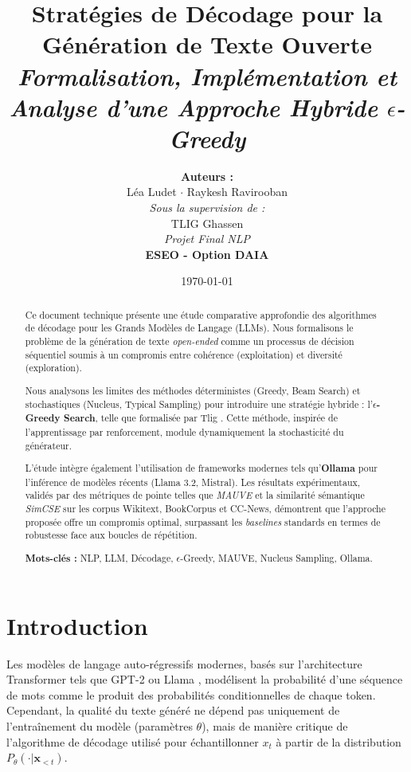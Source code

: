 \documentclass[12pt,a4paper]{article}
\title{
    \vspace{2cm}
    \textbf{\Huge Strat\'egies de D\'ecodage pour la G\'en\'eration de Texte Ouverte} \\ [1cm]
    \large \textit{Formalisation, Impl\'ementation et Analyse d'une Approche Hybride $\epsilon$-Greedy}
}
\author{
    \textbf{Auteurs :} \\[0.2cm]
    L\'ea Ludet $\cdot$ Raykesh Ravirooban \\[0.5cm]
    \small \textit{Sous la supervision de :} \\
    TLIG Ghassen \\[0.5cm]
    \small \textit{Projet Final NLP} \\
    \textbf{ESEO - Option DAIA}
}
\date{\today}
\newcommand{\context}{\mathbf{x}_{<t}}
\newcommand{\token}{x_t}
\newcommand{\prob}{P_\theta}
\begin{document}
\maketitle
\thispagestyle{empty}

\begin{abstract}
    \noindent Ce document technique pr\'esente une \'etude comparative approfondie des algorithmes de d\'ecodage pour les Grands Mod\`eles de Langage (LLMs). Nous formalisons le probl\`eme de la g\'en\'eration de texte \textit{open-ended} comme un processus de d\'ecision s\'equentiel soumis \`a un compromis entre coh\'erence (exploitation) et diversit\'e (exploration).
    
    Nous analysons les limites des m\'ethodes d\'eterministes (Greedy, Beam Search) et stochastiques (Nucleus, Typical Sampling) pour introduire une strat\'egie hybride : l'\textbf{$\epsilon$-Greedy Search}, telle que formalis\'ee par Tlig \cite{tlig2025epsilon}. Cette m\'ethode, inspir\'ee de l'apprentissage par renforcement, module dynamiquement la stochasticit\'e du g\'en\'erateur.
    
    L'\'etude int\`egre \'egalement l'utilisation de frameworks modernes tels qu'\textbf{Ollama} pour l'inf\'erence de mod\`eles r\'ecents (Llama 3.2, Mistral). Les r\'esultats exp\'erimentaux, valid\'es par des m\'etriques de pointe telles que \textit{MAUVE} et la similarit\'e s\'emantique \textit{SimCSE} sur les corpus Wikitext, BookCorpus et CC-News, d\'emontrent que l'approche propos\'ee offre un compromis optimal, surpassant les \textit{baselines} standards en termes de robustesse face aux boucles de r\'ep\'etition.
    
    \vspace{0.5cm}
    \noindent \textbf{Mots-cl\'es :} NLP, LLM, D\'ecodage, $\epsilon$-Greedy, MAUVE, Nucleus Sampling, Ollama.
\end{abstract}

\newpage

\tableofcontents
\newpage

\section{Introduction}
Les mod\`eles de langage auto-r\'egressifs modernes, bas\'es sur l'architecture Transformer \cite{vaswani2017attention} tels que GPT-2 \cite{radford2019language} ou Llama \cite{touvron2023llama}, mod\'elisent la probabilit\'e d'une s\'equence de mots comme le produit des probabilit\'es conditionnelles de chaque token. Cependant, la qualit\'e du texte g\'en\'er\'e ne d\'epend pas uniquement de l'entra\^inement du mod\`ele (param\`etres $\theta$), mais de mani\`ere critique de l'algorithme de d\'ecodage utilis\'e pour \'echantillonner $\token$ \`a partir de la distribution $\prob(\cdot | \context)$.
\end{document}
